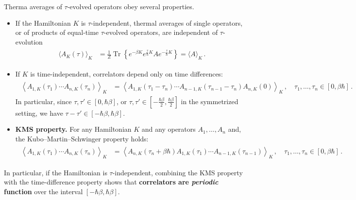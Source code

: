 \documentclass[../QFT_main.tex]{subfiles}
\begin{document}
\begin{mytheorem}
%
Therma averages of $\tau$-evolved operators obey several properties.
\begin{itemize}
    \item If the Hamiltonian $K$ is $\tau$-independent, thermal averages of single operators, or of products of equal-time $\tau$-evolved operators, are independent of $\tau$-evolution 
    {\small\begin{align}\begin{aligned}
        \langle A_K(\tau)\rangle_K
        &=
        \tfrac{1}{Z}\operatorname{Tr}\left\{
            e^{-\beta K}
            e^{\tfrac{\tau}{\hbar}K}
            A
            e^{-\tfrac{\tau}{\hbar}K}
        \right\}
        =\langle A\rangle_K\,.
    \end{aligned}\end{align}}
    \item If $K$ is time-independent, correlators depend only on time differences:
    {\small\begin{align}\begin{aligned}
        \left\langle
            A_{1,K}(\tau_1)\cdots A_{n,K}(\tau_n)
        \right\rangle_K
        &=
        \left\langle
            A_{1,K}(\tau_1-\tau_n)\cdots A_{n-1,K}(\tau_{n-1}-\tau_n)A_{n,K}(0)
        \right\rangle_K\,,
        \quad \tau_1,\ldots,\tau_n\in[0,\beta\hbar]\,.
    \end{aligned}\end{align}}
    In particular, since {\small$\tau,\tau'\in[0,\hbar\beta]$}, or {\small$\tau,\tau'\in[-\tfrac{\hbar\beta}{2},\tfrac{\hbar\beta}{2}]$} in the symmetrized setting, we have {\small$\tau-\tau'\in[-\hbar\beta,\hbar\beta]$}.
    \item \textbf{KMS property.} For any Hamiltonian $K$ and any operators $A_1,\ldots,A_n$ and, the Kubo--Martin--Schwinger property holds:
        {\small\begin{align}\begin{aligned}
            \left\langle
                A_{1,K}(\tau_1)\cdots A_{n,K}(\tau_n)
            \right\rangle_K
            &=
            \left\langle
                A_{n,K}(\tau_n+\beta\hbar)
                A_{1,K}(\tau_1)\cdots A_{n-1,K}(\tau_{n-1})
            \right\rangle_K\,,
            \quad \tau_1,\ldots,\tau_n\in[0,\beta\hbar]\,.
        \end{aligned}\end{align}}      
    \end{itemize}
In particular, if the Hamiltonian is $\tau$-independent, combining the KMS property with the time-difference property shows that \textbf{correlators are \emph{periodic} function} over the interval $[-\hbar\beta,\hbar\beta]$.
%
\end{mytheorem}
\end{document}
